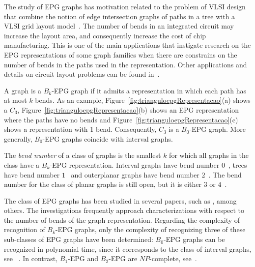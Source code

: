 \documentclass[9pt]{entcs}
\begin{document}
The study of EPG graphs has motivation related to the problem of VLSI design that combine the notion  of  edge  intersection graphs  of  paths  in  a  tree  with  a  VLSI  grid  layout  model~\cite{golumbic2009}. The number of bends in an integrated circuit may increase the layout area, and consequently increase the cost of chip manufacturing.
This is one of the main applications that instigate research on the EPG representations of some graph families when there are constrains on the number of bends in the paths used in the representation.
Other applications and  details  on  circuit  layout  problems can be found in~\cite{bandy1990, molitor1991}.  %

A graph is a $ B_k$-EPG graph if it admits a representation in which each path has at most $k$ bends. As an example, Figure~\ref{fig:trianguloepgRepresentacao}(a) shows a $C_3$, Figure~\ref{fig:trianguloepgRepresentacao}(b) shows an EPG representation where the paths have no bends and Figure~\ref{fig:trianguloepgRepresentacao}(c) shows a representation with 1 bend.   
 Consequently, $C_3$ is a $B_0$-EPG graph. More generally, $B_0$-EPG graphs coincide with interval graphs.

The \emph{bend number} of a class of graphs is the smallest $k$ for which all graphs in the class have a $B_k$-EPG representation. Interval graphs have bend number $0$~\cite{golumbic2009}, trees have bend number $1$~\cite{golumbic2009} and outerplanar graphs have bend number $2$~\cite{daniel2014b}. The bend number for the class of planar graphs is still open, but it is either $ 3 $ or $4$~\cite{daniel2014b}.



The class of EPG graphs has been studied in several papers, such as \cite{alcon2016, Asinowski2009, cohen2014, golumbic2009, heldt2014,  martin2017}, among others. The investigations frequently approach characterizations with respect to the number of bends of the graph representation. Regarding the complexity of recognition of $B_k$-EPG graphs, only the complexity of recognizing three of these sub-classes of EPG graphs have been determined: %
 $B_0$-EPG graphs can be recognized in polynomial time, since it corresponds to the class of interval graphs, see ~\cite{booth1976}. In contrast, $B_1$-EPG and $B_2$-EPG are $NP$-complete, see~\cite{heldt2014, martin2017}.
\end{document}
